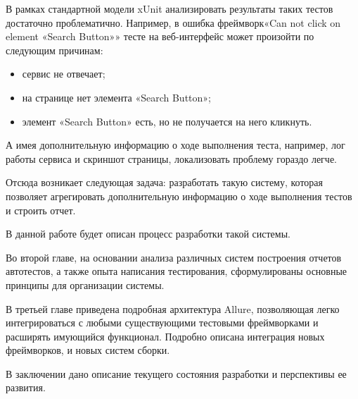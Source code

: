 В рамках стандартной модели xUnit анализировать результаты таких тестов достаточно проблематично. Например, в ошибка фреймворк«Can not click on element «Search Button»» тесте на веб-интерфейс может произойти по следующим причинам:

\begin{itemize}
\item сервис не отвечает;
\item на странице нет элемента «Search Button»;
\item элемент «Search Button» есть, но не получается на него кликнуть.
\end{itemize}

А имея дополнительную информацию о ходе выполнения теста, например, лог работы сервиса и скриншот страницы, локализовать проблему гораздо легче. 

Отсюда возникает следующая задача: разработать такую систему, которая позволяет агрегировать дополнительную информацию о ходе выполнения тестов и строить отчет. 

В данной работе будет описан процесс разработки такой системы.

Во второй главе, на основании анализа различных систем построения отчетов автотестов, а также опыта написания тестирования, сформулированы основные принципы для организации системы.

В третьей главе приведена подробная архитектура Allure, позволяющая легко интегрироваться с любыми существующими тестовыми фреймворками и расширять имующийся функционал. Подробно описана интеграция новых фреймворков, и новых систем сборки.

В заключении дано описание текущего состояния разработки и перспективы ее развития.